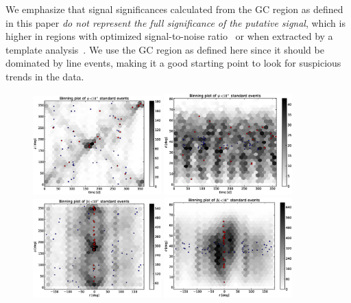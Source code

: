 \documentclass[aps,twocolumn,prd,superscriptaddress,showpacs,nofootinbib,fixfloat]{revtex4}
\begin{document}
We emphasize that signal significances calculated from the GC region as
defined in this paper \emph{do not represent the full significance of the
  putative signal}, which is higher in regions with optimized signal-to-noise
ratio~\cite{Weniger:2012} or when extracted by a template
analysis~\cite{linepaper}. We use the GC region as defined here since it
should be dominated by line events, making it a good starting point to look
for suspicious trends in the data.



\begin{figure}
  \centering
  \includegraphics[width=0.44\textwidth]{plots/TIME_PHI.eps}
  \includegraphics[width=0.44\textwidth]{plots/TIME_THETA.eps}
  \includegraphics[width=0.44\textwidth]{plots/L_PHI.eps}
  \includegraphics[width=0.44\textwidth]{plots/L_THETA.eps}

\end{figure}
\end{document}
